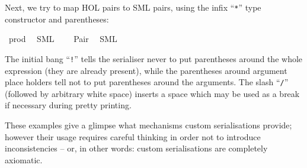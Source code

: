 \begin{isabellebody}
\begin{isamarkuptext}
\noindent Next, we try to map HOL pairs to SML pairs, using the
  infix ``\verb|*|'' type constructor and parentheses:%
\end{isamarkuptext}%
\isamarkuptrue%
%
\isadeliminvisible
%
\endisadeliminvisible
%
\isataginvisible
%
\endisataginvisible
{\isafoldinvisible}%
%
\isadeliminvisible
%
\endisadeliminvisible
%
\isadelimquotett
%
\endisadelimquotett
%
\isatagquotett
{}\isamarkupfalse%
\ prod\isanewline
\ \ {\isacharparenleft}SML\ \ {}\ {\isachardoublequoteopen}{\isacharasterisk}{\isachardoublequoteclose}{\isacharparenright}\isanewline
{}\isamarkupfalse%
\ Pair\isanewline
\ \ {\isacharparenleft}SML\ {\isachardoublequoteopen}{\isacharbang}{\isacharparenleft}{\isacharparenleft}{\isacharunderscore}{\isacharparenright}{\isacharcomma}{\isacharslash}\ {\isacharparenleft}{\isacharunderscore}{\isacharparenright}{\isacharparenright}{\isachardoublequoteclose}{\isacharparenright}%
\endisatagquotett
{\isafoldquotett}%
%
\isadelimquotett
%
\endisadelimquotett
%
\begin{isamarkuptext}%
\noindent The initial bang ``\verb|!|'' tells the serialiser
  never to put parentheses around the whole expression (they are
  already present), while the parentheses around argument place
  holders tell not to put parentheses around the arguments.  The slash
  ``\verb|/|'' (followed by arbitrary white space) inserts a
  space which may be used as a break if necessary during pretty
  printing.

  These examples give a glimpse what mechanisms custom serialisations
  provide; however their usage requires careful thinking in order not
  to introduce inconsistencies -- or, in other words: custom
  serialisations are completely axiomatic.


\end{isamarkuptext}
\end{isabellebody}
